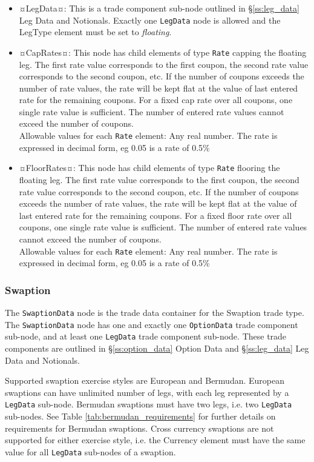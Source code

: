 \begin{itemize}
\item ¤LegData¤: This is a trade component sub-node outlined in \S \ref{ss:leg_data} Leg Data and Notionals. Exactly one \lstinline!LegData! node is allowed and the LegType element must be set to \emph{floating}.  
\item ¤CapRates¤: This node has child elements of type \lstinline!Rate! capping the floating leg. The first rate value corresponds to the first coupon, the second rate value corresponds to the second coupon, etc. If the number of coupons exceeds the number of rate values, the rate will be kept flat at the value of last entered rate for the remaining coupons. For a fixed cap rate over all coupons, one single rate value is sufficient. The number of entered rate values cannot exceed the number of coupons. \\ Allowable values for each \lstinline!Rate! element:  Any real number. The rate is expressed in decimal form, eg 0.05 is a rate of  0.5\%
\item ¤FloorRates¤: This node has child elements of type \lstinline!Rate! flooring the floating leg.  The first rate value corresponds to the first coupon, the second rate value corresponds to the second coupon, etc. If the number of coupons exceeds the number of rate values, the rate will be kept flat at the value of last entered rate for the remaining coupons. For a fixed floor rate over all coupons, one single rate value is sufficient. The number of entered rate values cannot exceed the number of coupons.\\ Allowable values for each \lstinline!Rate! element:  Any real number. The rate is expressed in decimal form, eg 0.05 is a rate of  0.5\%


\end{itemize}

\subsubsection{Swaption}

The \lstinline!SwaptionData!  node is the trade data container for the Swaption trade type. The \lstinline!SwaptionData!  node has one and exactly one \lstinline!OptionData! trade component sub-node, and at least one \lstinline!LegData! trade component sub-node.  These trade components are outlined in \S \ref{ss:option_data} Option Data and \S \ref{ss:leg_data} Leg Data and Notionals.

Supported swaption exercise styles are European and Bermudan. European swaptions can have unlimited number of legs, with each leg represented by a \lstinline!LegData! sub-node. Bermudan swaptions must have two legs, i.e. two \lstinline!LegData! sub-nodes. See Table \ref{tab:bermudan_requirements} for further details on requirements for Bermudan swaptions. Cross currency swaptions are not supported for either exercise style, i.e. the Currency element must have the same value for all \lstinline!LegData! sub-nodes of a swaption.


